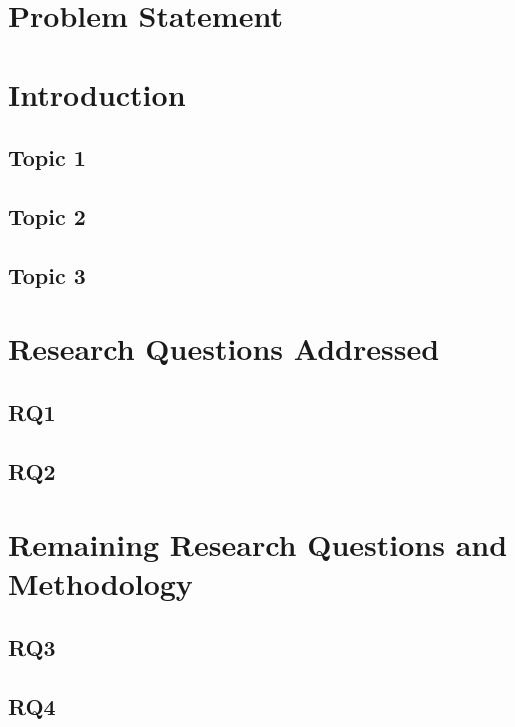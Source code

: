 \documentclass[11pt,a4paper]{article}
\begin{document}
\newpage

\section{Problem Statement}


\section{Introduction}


\subsection{Topic 1}


\subsection{Topic 2}


\subsection{Topic 3}


\section{Research Questions Addressed}


\subsection{RQ1}


\subsection{RQ2}


\section{Remaining Research Questions and Methodology}

\subsection{RQ3}


\subsection{RQ4}
\end{document}
